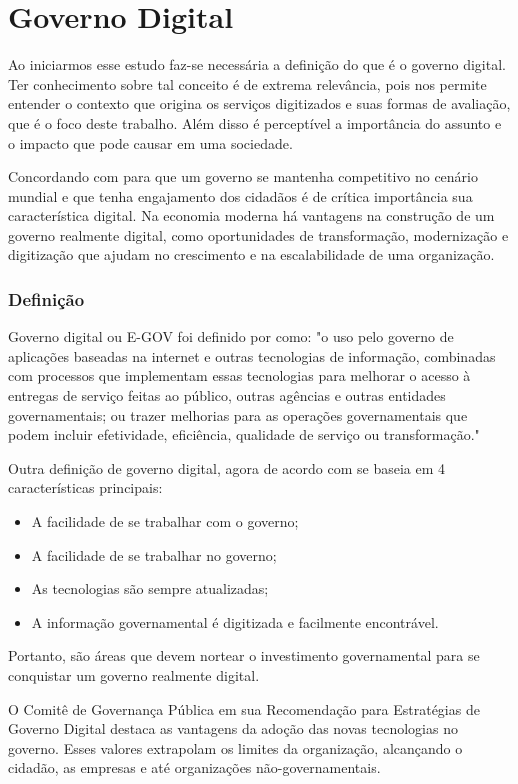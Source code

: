 \chapter[Governo Digital]{Governo Digital}
Ao iniciarmos esse estudo faz-se necessária a definição do que é o governo digital. Ter conhecimento sobre tal conceito é de extrema relevância, pois nos permite entender o contexto que origina os serviços digitizados e suas formas de avaliação, que é o foco deste trabalho. Além disso é perceptível a importância do assunto e o impacto que pode causar em uma sociedade.

Concordando com \cite{itac2016} para que um governo se mantenha competitivo no cenário mundial e que tenha engajamento dos cidadãos é de crítica importância sua característica digital. Na economia moderna há vantagens na construção de um governo realmente digital, como oportunidades de transformação, modernização e digitização que ajudam no crescimento e na escalabilidade de uma organização.

\subsection{Definição}
Governo digital ou E-GOV foi definido por \cite[p.~2902]{act2002} como: "o uso pelo governo de aplicações baseadas na internet e outras tecnologias de informação, combinadas com processos que implementam essas tecnologias para melhorar o acesso à entregas de serviço feitas ao público, outras agências e outras entidades governamentais; ou trazer melhorias para as operações governamentais que podem incluir efetividade, eficiência, qualidade de serviço ou transformação."

Outra definição de governo digital, agora de acordo com \cite{itac2016} se baseia em 4 características principais:
\begin{itemize}
	\item A facilidade de se trabalhar com o governo;
	\item A facilidade de se trabalhar no governo;
	\item As tecnologias são sempre atualizadas;
	\item A informação governamental é digitizada e facilmente encontrável.
\end{itemize}

Portanto, são áreas que devem nortear o investimento governamental para se conquistar um governo realmente digital.
 
O Comitê de Governança Pública em sua Recomendação para Estratégias de Governo Digital \cite{oecd2014} destaca as vantagens da adoção das novas tecnologias no governo. Esses valores extrapolam os limites da organização, alcançando o cidadão, as empresas e até organizações não-governamentais. 

